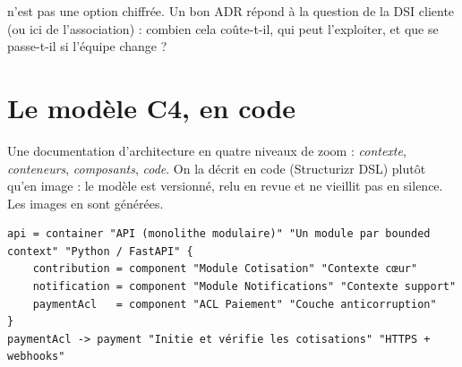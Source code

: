 \begin{piege}
 n'est pas une option chiffrée. Un bon ADR répond à la question de la DSI cliente
(ou ici de l'association) : combien cela coûte-t-il, qui peut l'exploiter, et que se passe-t-il si
l'équipe change ?
\end{piege}

\section{Le modèle C4, en code}
\begin{concept}[C4]
Une documentation d'architecture en quatre niveaux de zoom : \emph{contexte}, \emph{conteneurs}, \emph{composants},
\emph{code}. On la décrit en code (Structurizr DSL) plutôt qu'en image : le modèle est versionné, relu en revue et ne
vieillit pas en silence. Les images en sont générées.
\end{concept}
\begin{code}
\begin{Verbatim}
api = container "API (monolithe modulaire)" "Un module par bounded context" "Python / FastAPI" {
    contribution = component "Module Cotisation" "Contexte cœur"
    notification = component "Module Notifications" "Contexte support"
    paymentAcl   = component "ACL Paiement" "Couche anticorruption"
}
paymentAcl -> payment "Initie et vérifie les cotisations" "HTTPS + webhooks"
\end{Verbatim}
\end{code}

